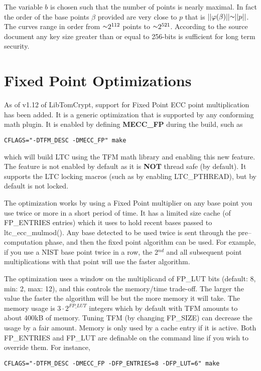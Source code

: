 \documentclass[synpaper]{book}
\def\approx{\raisebox{0.2ex}{\mbox{\small $\sim$}}}
\def\phi{\varphi}
\newcommand{\mysection}[1]    %
	{                   %
	\section{#1}
   \markboth{\textsf{www.libtom.org}}{\thesection ~ {#1}}
	}
\begin{document}
The variable $b$ is chosen such that the number of points is nearly maximal.  In fact the order of the base points $\beta$ 
provided are very close to $p$ that is $\vert \vert \phi(\beta) \vert \vert \approx \vert \vert p \vert \vert$.  The curves
range in order from $\approx 2^{112}$ points to $\approx 2^{521}$.  According to the source document any key size greater
than or equal to 256-bits is sufficient for long term security.  

\mysection{Fixed Point Optimizations}
As of v1.12 of LibTomCrypt, support for Fixed Point ECC point multiplication has been added.  It is a generic optimization that is
supported by any conforming math plugin.  It is enabled by defining \textbf{MECC\_FP} during the build, such as 

\begin{verbatim}
CFLAGS="-DTFM_DESC -DMECC_FP" make 
\end{verbatim}

which will build LTC using the TFM math library and enabling this new feature.  The feature is not enabled by default as it is \textbf{NOT} thread
safe (by default).  It supports the LTC locking macros (such as by enabling LTC\_PTHREAD), but by default is not locked.

The optimization works by using a Fixed Point multiplier on any base point you use twice or more in a short period of time.  It has a limited size
cache (of FP\_ENTRIES entries) which it uses to hold recent bases passed to ltc\_ecc\_mulmod().  Any base detected to be used twice is sent through the
pre--computation phase, and then the fixed point algorithm can be used.  For example, if you use a NIST base point twice in a row, the 2$^{nd}$ and 
all subsequent point multiplications with that point will use the faster algorithm.

The optimization uses a window on the multiplicand of FP\_LUT bits (default: 8, min: 2, max: 12), and this controls the memory/time trade-off. The larger the 
value the faster the algorithm will be but the more memory it will take.  The memory usage is $3 \cdot 2^{FP\_LUT}$ integers which by default
with TFM amounts to about 400kB of memory.  Tuning TFM (by changing FP\_SIZE) can decrease the usage by a fair amount.  Memory is only used by a cache entry
if it is active.  Both FP\_ENTRIES and FP\_LUT are definable on the command line if you wish to override them. For instance,

\begin{verbatim}
CFLAGS="-DTFM_DESC -DMECC_FP -DFP_ENTRIES=8 -DFP_LUT=6" make
\end{verbatim}
\end{document}
